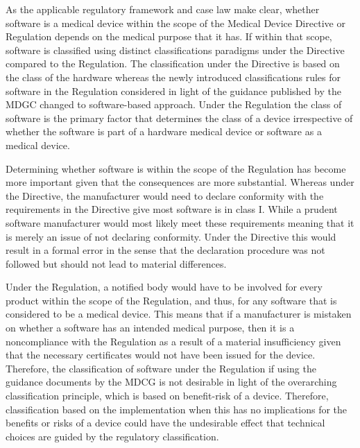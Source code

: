 \documentclass[
]{scrartcl}
\begin{document}
As the applicable regulatory framework and case law make clear, whether software is a medical device within the scope of the Medical Device Directive or Regulation depends on the medical purpose that it has. If within that scope, software is classified using distinct classifications paradigms under the Directive compared to the Regulation. The classification under the Directive is based on the class of the hardware whereas the newly introduced classifications rules for software in the Regulation considered in light of the guidance published by the MDGC changed to software-based approach. Under the Regulation the class of software is the primary factor that determines the class of a device irrespective of whether the software is part of a hardware medical device or software as a medical device.

Determining whether software is within the scope of the Regulation has become more important given that the consequences are more substantial. Whereas under the Directive, the manufacturer would need to declare conformity with the requirements in the Directive give most software is in class I. While a prudent software manufacturer would most likely meet these requirements meaning that it is merely an issue of not declaring conformity. Under the Directive this would result in a formal error in the sense that the declaration procedure was not followed but should not lead to material differences.

Under the Regulation, a notified body would have to be involved for every product within the scope of the Regulation, and thus, for any software that is considered to be a medical device. This means that if a manufacturer is mistaken on whether a software has an intended medical purpose, then it is a noncompliance with the Regulation as a result of a material insufficiency given that the necessary certificates would not have been issued for the device. Therefore, the classification of software under the Regulation if using the guidance documents by the MDCG is not desirable in light of the overarching classification principle, which is based on benefit-risk of a device. Therefore, classification based on the implementation when this has no implications for the benefits or risks of a device could have the undesirable effect that technical choices are guided by the regulatory classification.
\end{document}
